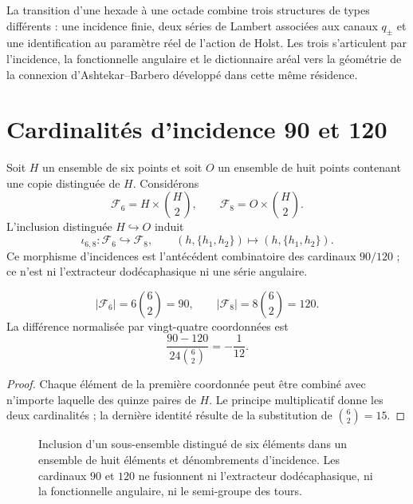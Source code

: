 \label{mdg:chap:barbero}

La transition d’une hexade à une octade combine trois structures de types
différents : une incidence finie, deux séries de Lambert associées aux
canaux \(q_\pm\) et une identification au paramètre réel de l’action de
Holst. Les trois s’articulent par l’incidence, la fonctionnelle angulaire et
le dictionnaire aréal vers la géométrie de la connexion
d’Ashtekar--Barbero développé dans cette même résidence.

\section{Cardinalités d’incidence 90 et 120}

Soit \(H\) un ensemble de six points et soit \(O\) un ensemble de huit points
contenant une copie distinguée de \(H\). Considérons
\[
 \mathcal F_6=H\times\binom H2,
 \qquad
 \mathcal F_8=O\times\binom H2.
\]
L’inclusion distinguée \(H\hookrightarrow O\) induit
\[
 \iota_{6,8}:\mathcal F_6\hookrightarrow\mathcal F_8,
 \qquad
 (h,\{h_1,h_2\})\longmapsto(h,\{h_1,h_2\}).
\]
Ce morphisme d’incidences est l’antécédent combinatoire des
cardinaux \(90/120\) ; ce n’est ni l’extracteur dodécaphasique ni une série angulaire.

\begin{theorem}
\[
 |\mathcal F_6|=6\binom62=90,
 \qquad
 |\mathcal F_8|=8\binom62=120.
\]
La différence normalisée par vingt-quatre coordonnées est
\[
 \frac{90-120}{24\binom62}=-\frac1{12}.
\]
\end{theorem}
\begin{proof}
Chaque élément de la première coordonnée peut être combiné avec n’importe laquelle des
quinze paires de \(H\). Le principe multiplicatif donne les deux cardinalités ;
la dernière identité résulte de la substitution de \(\binom62=15\).
\end{proof}

\begin{figure}[htbp]
\centering

\caption{Inclusion d’un sous-ensemble distingué de six éléments dans un ensemble de
huit éléments et dénombrements d’incidence. Les cardinaux \(90\) et \(120\) ne fusionnent ni l’extracteur
dodécaphasique, ni la fonctionnelle angulaire, ni le semi-groupe des tours.}
\label{mdg:fig:incidencia-seis-ocho-rev9}
\end{figure}

